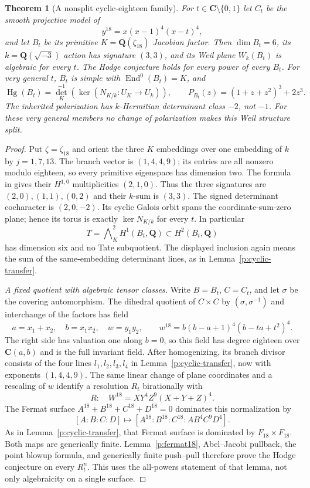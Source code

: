 \documentclass[11pt,reqno]{article}
\theoremstyle{emphasizedplain}
\newtheorem{theorem}{Theorem}[section]
\theoremstyle{emphasizeddefinition}
\theoremstyle{emphasizeddefinition}
\DeclareMathOperator{\End}{End}
\DeclareMathOperator{\Hg}{Hg}
\newcommand{\Q}{\mathbf Q}
\newcommand{\C}{\mathbf C}
\begin{document}
\begin{theorem}[A nonsplit cyclic-eighteen family]\label{p:S10cyclic18}
For $t\in\C\setminus\{0,1\}$ let $C_t$ be the smooth projective
model of
\[
 y^{18}=x(x-1)^4(x-t)^4,
\]
and let $B_t$ be its primitive $K=\Q(\zeta_{18})$ Jacobian factor.
Then $\dim B_t=6$, its $k=\Q(\sqrt{-3})$ action has signature
$(3,3)$, and its Weil plane $W_k(B_t)$ is algebraic for every $t$.
The Hodge conjecture holds for every power of every $B_t$.
For very general $t$, $B_t$ is simple with $\End^0(B_t)=K$, and
\[
 \Hg(B_t)=\det_K^{-1}(\ker(N_{K/k}:U_K\to U_k)),\qquad
 P_{B_t}(z)=(1+z+z^2)^3+2z^3.
\]
The inherited polarization has $k$-Hermitian determinant class
$-2$, not $-1$. For these very general members no change of
polarization makes this Weil structure split.
\end{theorem}
\begin{proof}
Put $\zeta=\zeta_{18}$ and orient the three $K$ embeddings over
one embedding of $k$ by $j=1,7,13$. The branch vector is
$(1,4,4,9)$; its entries are all nonzero modulo eighteen, so
every primitive eigenspace has dimension two. The formula
in \cite[Lemma 2.7]{MoonenCyclic} gives their $H^{1,0}$
multiplicities $(2,1,0)$. Thus the three signatures are
$(2,0),(1,1),(0,2)$ and their $k$-sum is $(3,3)$.
The signed determinant cocharacter is $(2,0,-2)$. Its cyclic
Galois orbit spans the coordinate-sum-zero plane; hence its
torus is exactly $\ker N_{K/k}$ for every $t$. In particular
\[
 T=\bigwedge\nolimits_K^2H^1(B_t,\Q)\subset H^2(B_t,\Q)
\]
has dimension six and no Tate subquotient. The displayed
inclusion again means the sum of the same-embedding determinant
lines, as in Lemma~\ref{p:cyclic-transfer}.

\emph{A fixed quotient with algebraic tensor classes.}
Write $B=B_t$, $C=C_t$, and let $\sigma$ be the covering automorphism.
The dihedral quotient of $C\times C$ by
$(\sigma,\sigma^{-1})$ and interchange of the factors has field
\[
 a=x_1+x_2,\quad b=x_1x_2,\quad w=y_1y_2,\qquad
 w^{18}=b(b-a+1)^4(b-ta+t^2)^4.
\]
The right side has valuation one along $b=0$, so this field has
degree eighteen over $\C(a,b)$ and is the full invariant field.
After homogenizing, its branch divisor consists of the four
lines $l_1,l_2,l_3,l_4$ in Lemma~\ref{p:cyclic-transfer}, now with
exponents $(1,4,4,9)$. The same linear change of plane coordinates
and a rescaling of $w$ identify a resolution $R_t$ birationally with
\[
 R:\quad W^{18}=XY^4Z^9(X+Y+Z)^4.
\]
The Fermat surface $A^{18}+B^{18}+C^{18}+D^{18}=0$ dominates
this normalization by
\[
 [A:B:C:D]\longmapsto[A^{18}:B^{18}:C^{18}:AB^4C^9D^4].
\]
As in Lemma~\ref{p:cyclic-transfer}, that Fermat surface is
dominated by $F_{18}\times F_{18}$. Both maps are generically
finite. Lemma~\ref{p:fermat18}, Abel--Jacobi pullback, the point
blowup formula, and generically finite push--pull therefore prove
the Hodge conjecture on every $R_t^n$. This uses the all-powers
statement of that lemma, not only algebraicity on a single surface.


\end{proof}
\end{document}
